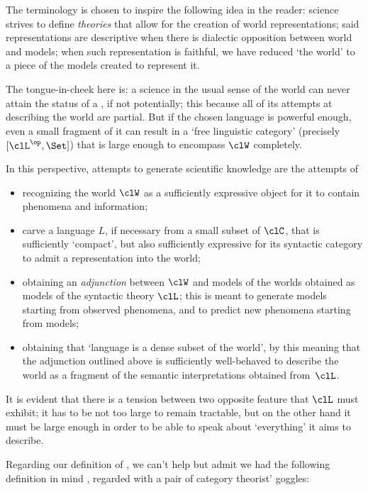 \begin{remark}\label{remark_yuggoth_2}
	The terminology is chosen to inspire the following idea in the reader: science strives to define \emph{theories} that allow for the creation of world representations; said representations are descriptive when there is dialectic opposition between world and models; when such representation is faithful, we have reduced `the world' to a piece of the models created to represent it.

	The tongue-in-cheek here is: a science in the usual sense of the world can never attain the status of a \science, if not potentially; this because all of its attempts at describing the world are partial. But if the chosen language is powerful enough, even a small fragment of it can result in a `free linguistic category' (precisely $[\clL^\op,\Set]$) that is large enough to encompass $\clW$ completely.
	
	In this perspective, attempts to generate scientific knowledge are the attempts of
	\begin{itemize}
		\item recognizing the world $\clW$ as a sufficiently expressive object for it to contain phenomena and information;
		\item carve a language $L$, if necessary from a small subset of $\clC$, that is sufficiently `compact', but also sufficiently expressive for its syntactic category to admit a representation into the world;
		\item obtaining an \emph{adjunction} between $\clW$ and models of the worlds obtained as models of the syntactic theory $\clL$; this is meant to generate models starting from observed phenomena, and to predict new phenomena starting from models;
		\item obtaining that `language is a dense subset of the world', by this meaning that the adjunction outlined above is sufficiently well-behaved to describe the world as a fragment of the semantic interpretations obtained from~$\clL$.
	\end{itemize}
	It is evident that there is a tension between two opposite feature that $\clL$ must exhibit; it has to be not too large to remain tractable, but on the other hand it must be large enough in order to be able to speak about `everything' it aims to describe.
\end{remark}
Regarding our definition of \science, we can't help but admit we had the following definition in mind \cite[2.1]{biologia}, regarded with a pair of category theorist' goggles:
